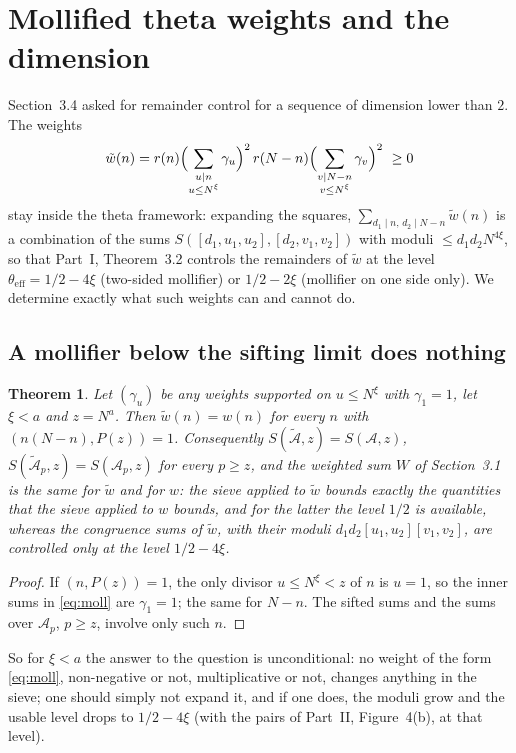 \documentclass[11pt,a4paper]{article}
\newtheorem{theorem}{Theorem}[section]
\theoremstyle{remark}
\theoremstyle{definition}
\newcommand{\cA}{\mathcal A}
\begin{document}
\section{Mollified theta weights and the dimension}

Section~3.4 asked for remainder control for a sequence of dimension lower than $2$. The weights
\begin{equation}\label{eq:moll}
\tilde w(n)=r(n)\Bigl(\sum_{\substack{u\mid n\\ u\le N^\xi}}\gamma_u\Bigr)^2\,r(N-n)\Bigl(\sum_{\substack{v\mid N-n\\ v\le N^\xi}}\gamma_v\Bigr)^2\ \ge0
\end{equation}
stay inside the theta framework: expanding the squares, $\sum_{d_1\mid n,\,d_2\mid N-n}\tilde w(n)$ is a combination of the sums $S([d_1,u_1,u_2],[d_2,v_1,v_2])$ with moduli $\le d_1d_2N^{4\xi}$, so that Part~I, Theorem~3.2 controls the remainders of $\tilde w$ at the level $\theta_{\mathrm{eff}}=1/2-4\xi$ (two-sided mollifier) or $1/2-2\xi$ (mollifier on one side only). We determine exactly what such weights can and cannot do.

\subsection{A mollifier below the sifting limit does nothing}
\begin{theorem}\label{thm:nothing}
Let $(\gamma_u)$ be any weights supported on $u\le N^\xi$ with $\gamma_1=1$, let $\xi<a$ and $z=N^a$. Then $\tilde w(n)=w(n)$ for every $n$ with $(n(N-n),P(z))=1$. Consequently $S(\tilde{\cA},z)=S(\cA,z)$, $S(\tilde{\cA}_p,z)=S(\cA_p,z)$ for every $p\ge z$, and the weighted sum $W$ of Section~3.1 is the same for $\tilde w$ and for $w$: the sieve applied to $\tilde w$ bounds exactly the quantities that the sieve applied to $w$ bounds, and for the latter the level $1/2$ is available, whereas the congruence sums of $\tilde w$, with their moduli $d_1d_2[u_1,u_2][v_1,v_2]$, are controlled only at the level $1/2-4\xi$.
\end{theorem}
\begin{proof}
If $(n,P(z))=1$, the only divisor $u\le N^\xi<z$ of $n$ is $u=1$, so the inner sums in \eqref{eq:moll} are $\gamma_1=1$; the same for $N-n$. The sifted sums and the sums over $\cA_p$, $p\ge z$, involve only such $n$.
\end{proof}
So for $\xi<a$ the answer to the question is unconditional: no weight of the form \eqref{eq:moll}, non-negative or not, multiplicative or not, changes anything in the sieve; one should simply not expand it, and if one does, the moduli grow and the usable level drops to $1/2-4\xi$ (with the pairs of Part~II, Figure~4(b), at that level).
\end{document}
